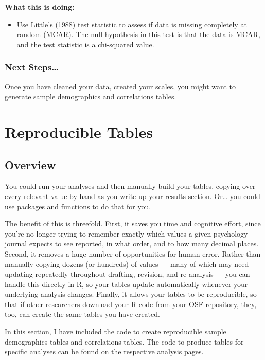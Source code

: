 \documentclass[
  letterpaper,
  DIV=11,
  numbers=noendperiod]{scrreprt}
\providecommand{\tightlist}{%
  \setlength{\itemsep}{0pt}\setlength{\parskip}{0pt}}\usepackage{longtable,booktabs,array}
\begin{document}
\textbf{What this is doing:}

\begin{itemize}
\tightlist
\item
  Use Little's (1988) test statistic to assess if data is missing
  completely at random (MCAR). The null hypothesis in this test is that
  the data is MCAR, and the test statistic is a chi-squared value.
\end{itemize}

\section{Next Steps\ldots{}}\label{next-steps}

Once you have cleaned your data, created your scales, you might want to
generate \href{sample-descriptives.qmd}{sample demographics} and
\href{correlation-table.qmd}{correlations} tables.

\part{Reproducible Tables}

\chapter{Overview}\label{overview}

You could run your analyses and then manually build your tables, copying
over every relevant value by hand as you write up your results section.
Or\ldots{} you could use packages and functions to do that for you.

The benefit of this is threefold. First, it saves you time and cognitive
effort, since you're no longer trying to remember exactly which values a
given psychology journal expects to see reported, in what order, and to
how many decimal places. Second, it removes a huge number of
opportunities for human error. Rather than manually copying dozens (or
hundreds) of values --- many of which may need updating repeatedly
throughout drafting, revision, and re-analysis --- you can handle this
directly in R, so your tables update automatically whenever your
underlying analysis changes. Finally, it allows your tables to be
reproducible, so that if other researchers download your R code from
your OSF repository, they, too, can create the same tables you have
created.

In this section, I have included the code to create reproducible sample
demographics tables and correlations tables. The code to produce tables
for specific analyses can be found on the respective analysis pages.
\end{document}
